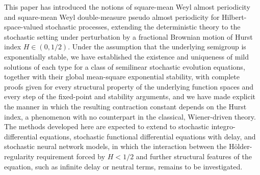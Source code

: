 \documentclass[11pt]{amsart}
\begin{document}
This paper has introduced the notions of square-mean Weyl almost periodicity and square-mean Weyl double-measure pseudo almost periodicity for Hilbert-space-valued stochastic processes, extending the deterministic theory to the stochastic setting under perturbation by a fractional Brownian motion of Hurst index $H\in(0,1/2)$. Under the assumption that the underlying semigroup is exponentially stable, we have established the existence and uniqueness of mild solutions of each type for a class of semilinear stochastic evolution equations, together with their global mean-square exponential stability, with complete proofs given for every structural property of the underlying function spaces and every step of the fixed-point and stability arguments, and we have made explicit the manner in which the resulting contraction constant depends on the Hurst index, a phenomenon with no counterpart in the classical, Wiener-driven theory. The methods developed here are expected to extend to stochastic integro-differential equations, stochastic functional differential equations with delay, and stochastic neural network models, in which the interaction between the H\"{o}lder-regularity requirement forced by $H<1/2$ and further structural features of the equation, such as infinite delay or neutral terms, remains to be investigated.
\end{document}
